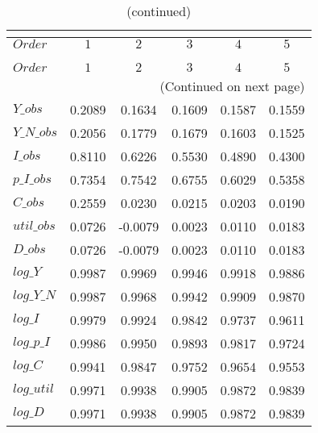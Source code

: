  
\begin{center}
\begin{longtable}{lccccc} 
\caption{COEFFICIENTS OF AUTOCORRELATION}\\
 \label{Table:th_autocorr_matrix}\\
\toprule 
$Order      $	 & 	 $         1$	 & 	 $         2$	 & 	 $         3$	 & 	 $         4$	 & 	 $         5$\\
\midrule \endfirsthead 
\caption{(continued)}\\
 \toprule \\ 
$Order      $	 & 	 $         1$	 & 	 $         2$	 & 	 $         3$	 & 	 $         4$	 & 	 $         5$\\
\midrule \endhead 
\midrule \multicolumn{6}{r}{(Continued on next page)} \\ \bottomrule \endfoot 
\bottomrule \endlastfoot 
$Y\_obs     $	 & 	    0.2089	 & 	    0.1634	 & 	    0.1609	 & 	    0.1587	 & 	    0.1559 \\ 
$Y\_N\_obs  $	 & 	    0.2056	 & 	    0.1779	 & 	    0.1679	 & 	    0.1603	 & 	    0.1525 \\ 
$I\_obs     $	 & 	    0.8110	 & 	    0.6226	 & 	    0.5530	 & 	    0.4890	 & 	    0.4300 \\ 
$p\_I\_obs  $	 & 	    0.7354	 & 	    0.7542	 & 	    0.6755	 & 	    0.6029	 & 	    0.5358 \\ 
$C\_obs     $	 & 	    0.2559	 & 	    0.0230	 & 	    0.0215	 & 	    0.0203	 & 	    0.0190 \\ 
$util\_obs  $	 & 	    0.0726	 & 	   -0.0079	 & 	    0.0023	 & 	    0.0110	 & 	    0.0183 \\ 
$D\_obs     $	 & 	    0.0726	 & 	   -0.0079	 & 	    0.0023	 & 	    0.0110	 & 	    0.0183 \\ 
$log\_Y     $	 & 	    0.9987	 & 	    0.9969	 & 	    0.9946	 & 	    0.9918	 & 	    0.9886 \\ 
$log\_Y\_N  $	 & 	    0.9987	 & 	    0.9968	 & 	    0.9942	 & 	    0.9909	 & 	    0.9870 \\ 
$log\_I     $	 & 	    0.9979	 & 	    0.9924	 & 	    0.9842	 & 	    0.9737	 & 	    0.9611 \\ 
$log\_p\_I  $	 & 	    0.9986	 & 	    0.9950	 & 	    0.9893	 & 	    0.9817	 & 	    0.9724 \\ 
$log\_C     $	 & 	    0.9941	 & 	    0.9847	 & 	    0.9752	 & 	    0.9654	 & 	    0.9553 \\ 
$log\_util  $	 & 	    0.9971	 & 	    0.9938	 & 	    0.9905	 & 	    0.9872	 & 	    0.9839 \\ 
$log\_D     $	 & 	    0.9971	 & 	    0.9938	 & 	    0.9905	 & 	    0.9872	 & 	    0.9839 \\ 
\end{longtable}
 \end{center}
